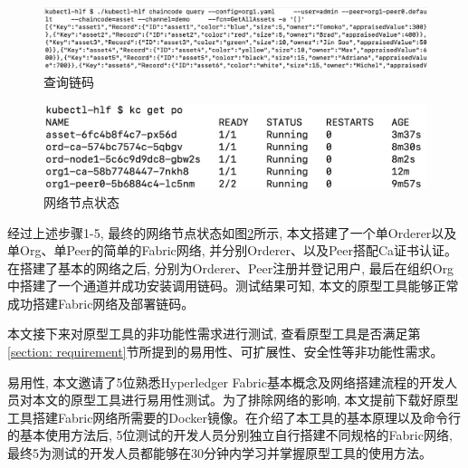 \begin{figure}[h] %
    \centering %
    \includegraphics[width=1.0\textwidth]{FIGs/chapter5/chaincode.png} %
    \caption{查询链码} %
    \label{chaincode_test_result} %
\end{figure}%


\begin{figure}[h] %
    \centering %
    \includegraphics[width=1.0\textwidth]{FIGs/chapter5/fabric_result.png} %
    \caption{网络节点状态} %
    \label{fabric_result} %
\end{figure}%

经过上述步骤1-5, 最终的网络节点状态如图\ref{fabric_result}所示, 本文搭建了一个单Orderer以及单Org、单Peer的简单的Fabric网络, 并分别Orderer、以及Peer搭配Ca证书认证。在搭建了基本的网络之后, 分别为Orderer、Peer注册并登记用户, 最后在组织Org中搭建了一个通道并成功安装调用链码。测试结果可知, 本文的原型工具能够正常成功搭建Fabric网络及部署链码。

本文接下来对原型工具的非功能性需求进行测试, 查看原型工具是否满足第\ref{section: requirement}节所提到的易用性、可扩展性、安全性等非功能性需求。

易用性, 本文邀请了5位熟悉Hyperledger Fabric基本概念及网络搭建流程的开发人员对本文的原型工具进行易用性测试。为了排除网络的影响,
本文提前下载好原型工具搭建Fabric网络所需要的Docker镜像。在介绍了本工具的基本原理以及命令行的基本使用方法后, 5位测试的开发人员分别独立自行搭建不同规格的Fabric网络, 最终5为测试的开发人员都能够在30分钟内学习并掌握原型工具的使用方法。

